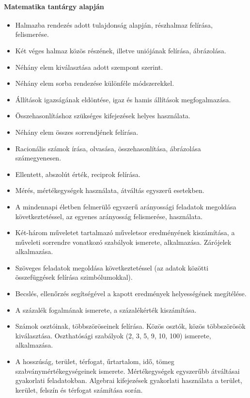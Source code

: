 \paragraph{Matematika tantárgy alapján}
\begin{itemize}
\item Halmazba rendezés adott tulajdonság alapján, részhalmaz felírása, felismerése.
\item Két véges halmaz közös részének, illetve uniójának felírása, ábrázolása.
\item Néhány elem kiválasztása adott szempont szerint.
\item Néhány elem sorba rendezése különféle módszerekkel.
\item Állítások igazságának eldöntése, igaz és hamis állítások megfogalmazása.
\item Összehasonlításhoz szükséges kifejezések helyes használata.
\item Néhány elem összes sorrendjének felírása.
\item Racionális számok írása, olvasása, összehasonlítása, ábrázolása számegyenesen.
\item Ellentett, abszolút érték, reciprok felírása.
\item Mérés, mértékegységek használata, átváltás egyszerű esetekben.
\item A mindennapi életben felmerülő egyszerű arányossági feladatok megoldása következtetéssel, az egyenes arányosság felismerése, használata.
\item Két-három műveletet tartalmazó műveletsor eredményének kiszámítása, a műveleti sorrendre vonatkozó szabályok ismerete, alkalmazása. Zárójelek alkalmazása.
\item Szöveges feladatok megoldása következtetéssel (az adatok közötti összefüggések felírása szimbólumokkal).
\item Becslés, ellenőrzés segítségével a kapott eredmények helyességének megítélése.
\item A százalék fogalmának ismerete, a százalékérték kiszámítása.
\item Számok osztóinak, többszöröseinek felírása. Közös osztók, közös többszörösök kiválasztása. Oszthatósági szabályok (2, 3, 5, 9, 10, 100) ismerete, alkalmazása.
\item A hosszúság, terület, térfogat, űrtartalom, idő, tömeg szabványmértékegységeinek ismerete. Mértékegységek egyszerűbb átváltásai gyakorlati feladatokban. Algebrai kifejezések gyakorlati használata a terület, kerület, felszín és térfogat számítása során.

\end{itemize}
